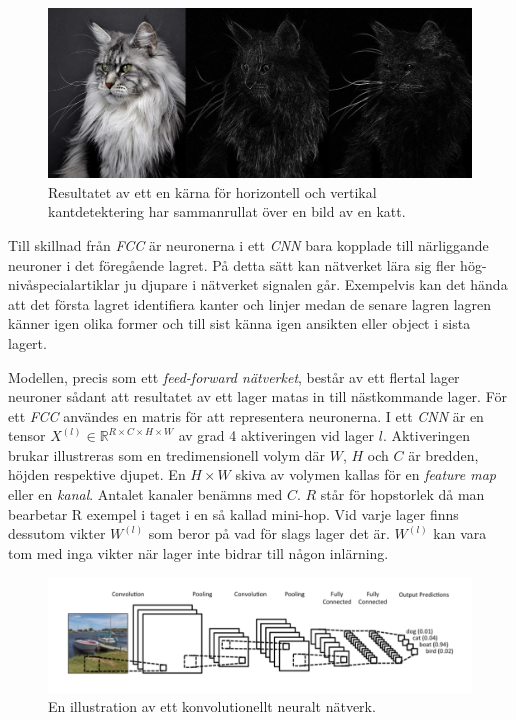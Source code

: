 \documentclass[a4paper,11pt,twoside]{article}
\begin{document}
\begin{figure}[h]\label{figkatter}
	\centering
  		\includegraphics[scale=0.33]{katter.png}
  	\caption{Resultatet av ett en kärna för horizontell och vertikal kantdetektering har sammanrullat över en bild av en katt.}
\end{figure}

Till skillnad från \textit{FCC} är neuronerna i ett \textit{CNN} bara kopplade till närliggande neuroner i det föregående lagret. På detta sätt kan nätverket lära sig fler hög-nivåspecialartiklar ju djupare i nätverket signalen går. Exempelvis kan det hända att det första lagret identifiera kanter och linjer medan de senare lagren lagren känner igen olika former och till sist känna igen ansikten eller object i sista lagert. \cite{cs231n}

Modellen, precis som ett \textit{feed-forward nätverket}, består av ett flertal lager neuroner sådant att resultatet av ett lager matas in till nästkommande lager. För ett \textit{FCC} användes en matris för att representera neuronerna. I ett \textit{CNN} är en tensor $X^{(l)} \in \mathbb{R}^{R \times C  \times H \times W}$ av grad 4 aktiveringen vid lager $l$. Aktiveringen brukar illustreras som en tredimensionell volym där $W$, $H$ och $C$ är bredden, höjden respektive djupet. En $H \times W$ skiva av volymen kallas för en \textit{feature map} eller en \textit{kanal}. Antalet kanaler benämns med $C$. $R$ står för hopstorlek då man bearbetar R exempel i taget i en så kallad mini-hop. Vid varje lager finns dessutom vikter $W^{(l)}$  som beror på vad för slags lager det är. $W^{(l)}$ kan vara tom med inga vikter när lager inte bidrar till någon inlärning. \cite{cs231n} \cite{convmath}

\begin{figure}[h]\label{figboatcnn}
	\centering
  		\includegraphics[scale=0.6]{boatcnn.png}
  	\caption{En illustration av ett konvolutionellt neuralt nätverk. \cite{figboatcnn}}
\end{figure}
\end{document}
